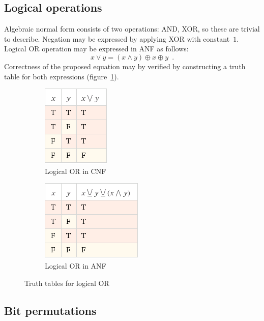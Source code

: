 \subsection{Logical operations}

Algebraic normal form consists of two operations: AND, XOR, so these are trivial
to describe. Negation may be expressed by applying XOR with constant~$1$.
Logical OR operation may be expressed in ANF as follows:
\begin{equation}
x \lor y = (x \land y) \oplus x \oplus y\enspace.
\end{equation}
Correctness of the proposed equation may by verified by constructing a truth
table for both expressions (figure~\ref{fig:eq_logic_or}).
\begin{figure}[htbp]
    \begin{subfigure}[b]{0.5\textwidth}
        \centering
        \includegraphics[scale=0.7]{images/eq_logic_or}
        \caption{Logical OR in CNF}
    \end{subfigure}
    \quad
    \begin{subfigure}[b]{0.5\textwidth}
        \centering
        \includegraphics[scale=0.7]{images/eq_logic_or_anf}
        \caption{Logical OR in ANF}
    \end{subfigure}
	\caption{Truth tables for logical OR}
	\label{fig:eq_logic_or}
\end{figure}


\subsection{Bit permutations}

